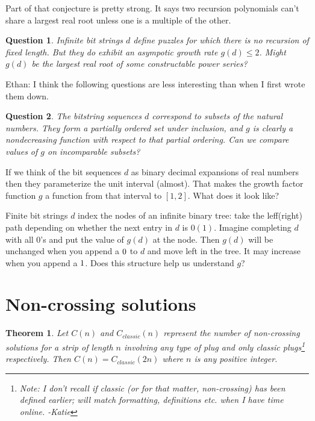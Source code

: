 \documentclass[10pt]{article}
\newtheorem{theorem}{Theorem}
\newtheorem{question}{Question}
\numberwithin{equation}{section}
\newenvironment{anote}
               {{\textcolor{blue}{Note:}}
                 \itshape
               }
               {}
\newcommand{\plug}[1]{%
\mbox{{\textbf\texttt #1}}
}
\begin{document}
  \begin{anote}
Part of that conjecture is pretty strong. It says two recursion
polynomials can't share a largest real root unless one is a multiple
of the other.
\end{anote}

  \begin{question}
Infinite bit strings $d$ define puzzles for which there is no
recursion of fixed length. But they do exhibit an asympotic growth
rate $g(d) \le 2$. Might $g(d)$ be the largest real root of some
constructable power series?
  \end{question}
  
  \begin{anote}
Ethan: I think the following questions are less interesting than when
I first wrote them down.
\end{anote}
\begin{question}
The bitstring sequences $d$ correspond to subsets of the natural
numbers. They form a partially ordered set under inclusion, and $g$ is
clearly a nondecreasing function with respect to that partial
ordering.  Can we compare values of $g$ on incomparable subsets? 
\end{question}
 
 If we think of the bit sequences $d$ as binary decimal expansions of
 real numbers then they parameterize the unit interval (almost). That
 makes the growth factor function $g$ a function from that interval to
 $[1,2]$. What does it look like? 
 
 Finite bit strings $d$ index the nodes of an infinite binary tree:
 take the leff(right) path depending on whether the next entry in $d$
 is $0(1)$. Imagine completing $d$ with all $0$'s and put the value of
 $g(d)$ at the node. Then $g(d)$ will be unchanged when you append a
 $\plug{0}$ to $d$ and move left in the tree. It may increase when you
 append a $\plug{1}$. Does this structure  help us understand $g$? 


\section{Non-crossing solutions}

\begin{theorem}
Let $C(n)$ and $C_{classic}(n)$ represent the number of non-crossing solutions for a strip of length $n$ involving any type of plug and only classic plugs\footnote{Note: I don't recall if classic (or for that matter, non-crossing) has been defined earlier; will match formatting, definitions etc. when I have time online. -Katie} respectively.  Then $C(n) = C_{classic}(2n)$ where $n$ is any positive integer.
\end{theorem}
\end{document}
